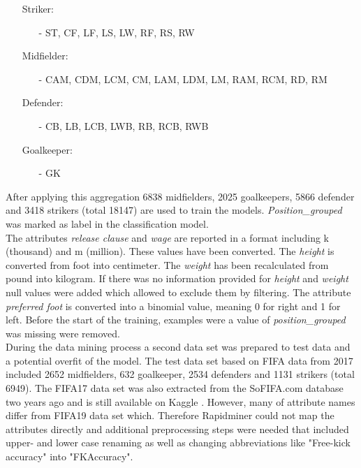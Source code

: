 \documentclass[runningheads]{llncs}
\begin{document}
\begin{itemize} 
\item[] Striker:
\begin{itemize}
\item[-] ST, CF, LF, LS, LW, RF, RS, RW
\end{itemize}
\item[] Midfielder:
\begin{itemize}
\item[-] CAM, CDM, LCM, CM, LAM, LDM, LM, RAM, RCM, RD, RM
\end{itemize}
\item[] Defender:
\begin{itemize} 
\item[-] CB, LB, LCB, LWB, RB, RCB, RWB
\end{itemize}
\item[] Goalkeeper:
\begin{itemize}
\item[-] GK
\end{itemize}
\end{itemize}
After applying this aggregation 6838 midfielders, 2025 goalkeepers, 5866 defender and 3418 strikers (total 18147) are used to train the models. \textit{Position\_grouped }was marked as label in the classification model.\\
The attributes\textit{ release clause} and \textit{wage} are reported in a format including k (thousand) and m (million). These values have been converted. The \textit{height} is converted from foot into centimeter. The \textit{weight} has been recalculated from pound into kilogram. If there was no information provided for \textit{height} and \textit{weight} null values were added which allowed to exclude them by filtering. The attribute \textit{preferred foot }is converted into a binomial value, meaning 0 for right and 1 for left. %
Before the start of the training, examples were a value of \textit{position\_grouped} was missing were removed.\\
During the data mining process a second data set was prepared to test data and a potential overfit of the model. The test data set based on FIFA data from 2017 included 2652 midfielders, 632 goalkeeper, 2534 defenders and 1131 strikers (total 6949).
The FIFA17 data set was also extracted from the SoFIFA.com database two years ago and is still available on Kaggle \cite{ref_kaggle2017}. However, many of attribute names differ from FIFA19 data set which. Therefore  Rapidminer could not map the attributes directly and additional preprocessing steps were needed that included upper- and lower case renaming as well as changing abbreviations like "Free-kick accuracy" into "FKAccuracy".
\end{document}
